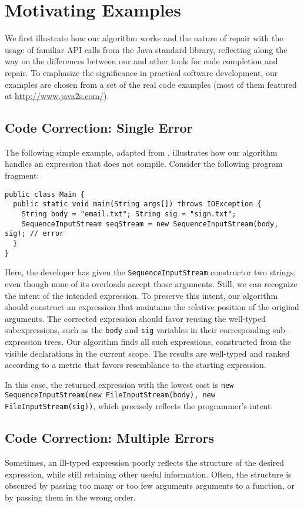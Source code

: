 \section{Motivating Examples}
\label{sec:examples}
We first illustrate how our algorithm works and the nature of repair with the usage of familiar API calls from the Java standard library, reflecting along the way on the differences between our and other tools for code completion and repair. To emphasize the significance in practical software development, our examples are chosen from a set of the real code examples (most of them featured at \url{http://www.java2s.com/}{}).

\subsection{Code Correction: Single Error}
\label{sec:examples:single}
The following simple example, adapted from \cite{GveroETAL13CompleteCompletionTypesWeights}, illustrates how our algorithm handles an expression that does not compile. Consider the following program fragment:
\begin{lstlisting}
public class Main {
  public static void main(String args[]) throws IOException {
    String body = "email.txt"; String sig = "sign.txt";
    SequenceInputStream seqStream = new SequenceInputStream(body, sig); // error
  }
} 
\end{lstlisting}
Here, the developer has given the \lstinline{SequenceInputStream} constructor two strings, even though none of its overloads accept those arguments. Still, we can recognize the intent of the intended expression. To preserve this intent, our algorithm should construct an expression that maintains the relative position of the original arguments. The corrected expression should favor reusing the well-typed subexpressions, such as the \lstinline{body} and \lstinline{sig} variables in their corresponding sub-expression trees. Our algorithm finds all such expressions, constructed from the visible declarations in the current scope. The results are well-typed and ranked according to a metric that favors resemblance to the starting expression.

In this case, the returned expression with the lowest cost is \lstinline{new SequenceInputStream(new FileInputStream(body), new FileInputStream(sig))}, which precisely reflects the programmer's intent.

\subsection{Code Correction: Multiple Errors}
\label{sec:examples:multiple}
Sometimes, an ill-typed expression poorly reflects the structure of the desired expression, while still retaining other useful information. Often, the structure is obscured by passing too many or too few arguments arguments to a function, or by passing them in the wrong order.

